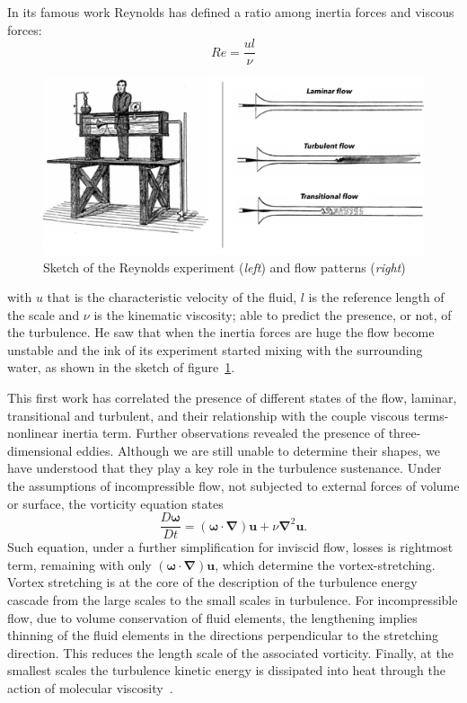 \par
In its famous work Reynolds has defined a ratio among inertia forces and viscous forces:
\begin{equation}
Re = \frac{ul}{\nu}
\end{equation}
\begin{figure}
\begin{center}
\includegraphics[width=1\textwidth]{grafici/reynolds_exp}
\caption{Sketch of the Reynolds experiment (\emph{left}) and flow patterns (\emph{right})}
\label{Reynolds:exp}
\end{center}
\end{figure}

with $u$ that is the characteristic velocity of the fluid, $l$ is the reference length of the scale and $\nu$ is the kinematic viscosity; able to predict the presence, or not, of the turbulence. He saw that when the inertia forces are huge the flow become unstable and the ink of its experiment started mixing with the surrounding water, as shown in the sketch of figure~\ref{Reynolds:exp}.
\par
This first work has correlated the presence of different states of the flow, laminar, transitional and turbulent, and their relationship with the couple viscous terms-nonlinear inertia term.
Further observations revealed the presence of three-dimensional eddies. Although we are still unable to determine their shapes, we have understood that they play a key role in the turbulence sustenance. Under the assumptions of incompressible flow, not subjected to external forces of volume or surface, the vorticity equation states
\begin{equation}
\frac{D \boldsymbol{\omega}}{D t} = (\boldsymbol{\omega} \cdot \boldsymbol{\nabla})\boldsymbol{u} + \nu \boldsymbol{\nabla}^{2} \boldsymbol{u}.
\end{equation}
Such equation, under a further simplification for inviscid flow, losses is rightmost term, remaining with only $ (\boldsymbol{\omega} \cdot \boldsymbol{\nabla})\boldsymbol{u}$, which determine the vortex-stretching. 
Vortex stretching is at the core of the description of the turbulence energy cascade from the large scales to the small scales in turbulence.
For incompressible flow, due to volume conservation of fluid elements, the lengthening implies thinning of the fluid elements in the directions perpendicular to the stretching direction. This reduces the length scale of the associated vorticity. Finally, at the smallest scales the turbulence kinetic energy is dissipated into heat through the action of molecular viscosity~\cite{Lumley}.





